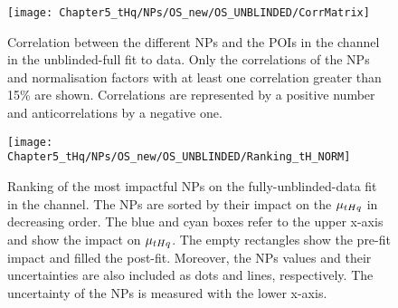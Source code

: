  

\begin{figure}[h]
\centering
 \texttt{[image: Chapter5\_tHq/NPs/OS\_new/OS\_UNBLINDED/CorrMatrix]}
\caption{Correlation between the different NPs and the POIs in the \dilepOStau channel in the unblinded-full fit to data. 
Only the correlations of the NPs and normalisation factors with at least one correlation greater than 15\% are shown.
Correlations are represented by a positive number and anticorrelations by a negative one.} 
\label{fig:ChaptH:fitToData:OS:Correlation}
\end{figure}


\begin{figure}[h]%
    \centering
        \texttt{[image: Chapter5\_tHq/NPs/OS\_new/OS\_UNBLINDED/Ranking\_tH\_NORM]}
    \caption{Ranking of the most impactful NPs on the fully-unblinded-data fit in the \dilepOStau channel. 
    The NPs are sorted by their impact on the $\mu_{tHq}$ in decreasing order. 
    The blue and cyan boxes refer to the upper x-axis and show the impact on $\mu_{tHq}$.
    The empty rectangles show the pre-fit impact and filled the post-fit. 
    Moreover, the NPs values and their uncertainties are also included as dots and 
    lines, respectively. The uncertainty of the NPs is measured with the lower x-axis.}
    \label{fig:ChaptH:fitToData:OS:Ranking}
\end{figure}


